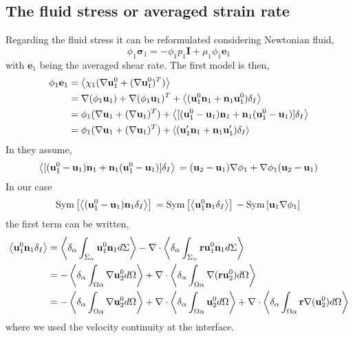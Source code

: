 \subsection{The fluid stress or averaged strain rate}
Regarding the fluid stress it can be reformulated considering Newtonian fluid,
\begin{equation}
    \phi_1 \bm{\sigma}_1 
    = - \phi_1 p_1 \textbf{I}
    + \mu_1 \phi_1 \textbf{e}_1
\end{equation}
with $\textbf{e}_1$ being the averaged shear rate. 
The first model is then, 
\begin{align*}
    \phi_1 \textbf{e}_1
    &= \left<\chi_1 (\nabla \textbf{u}_1^0+(\nabla \textbf{u}_1^0)^T)\right>\\
    &= \nabla (\phi_1\textbf{u}_1)+ \mathbf{\nabla} (\phi_1\textbf{u}_1)^T
    + \left<(\textbf{u}_1^0  \textbf{n}_1 +  \textbf{n}_1\textbf{u}_1^0)\delta_I\right>\\
    &= \phi_1 (\nabla \textbf{u}_1+ (\mathbf{\nabla} \textbf{u}_1)^T)
    + \left<[(\textbf{u}_1^0 - \textbf{u}_1)  \textbf{n}_1 +  \textbf{n}_1(\textbf{u}_1^0 - \textbf{u}_1 )]\delta_I\right>\\
    &= \phi_1 (\nabla \textbf{u}_1+ (\mathbf{\nabla} \textbf{u}_1)^T)
    + \left<(\textbf{u}_1' \textbf{n}_1 +  \textbf{n}_1\textbf{u}_1')\delta_I\right>\\
\end{align*}
In \citet[chap 9]{ishii2010thermo} they assume,
\begin{equation}
    \left<[(\textbf{u}_1^0 - \textbf{u}_1)  \textbf{n}_1 +  \textbf{n}_1(\textbf{u}_1^0 - \textbf{u}_1 )]\delta_I\right>\\
    = 
    (\textbf{u}_2 - \textbf{u}_1)  \mathbf{\nabla} \phi_1 +  \mathbf{\nabla} \phi_1(\textbf{u}_2 - \textbf{u}_1 )\\
\end{equation}
In our case 
\begin{equation}
    \text{Sym}\left[\left<(\textbf{u}_1^0 - \textbf{u}_1)  \textbf{n}_1\delta_I \right> \right]\\
    = 
    \text{Sym}\left[\left<\textbf{u}_1^0  \textbf{n}_1\delta_I  \right> \right]\\
    - \text{Sym}\left[\textbf{u}_1 \mathbf{\nabla} \phi_1 \right]\\
\end{equation}
the first term can be written, 
\begin{align}
    \left<\textbf{u}_1^0  \textbf{n}_1\delta_I  \right>
    &=
    \left<\delta_\alpha \int_{\Sigma_\alpha} \textbf{u}_1^0  \textbf{n}_1 d\Sigma  \right>
    -\mathbf{\nabla} \cdot \left<\delta_\alpha \int_{\Sigma_\alpha} \textbf{r}\textbf{u}_1^0  \textbf{n}_1 d\Sigma  \right>\\
    &=
    - \left<\delta_\alpha \int_{\Omega\alpha} \mathbf{\nabla} \textbf{u}_2^0   d\Omega   \right>
    + \mathbf{\nabla} \cdot \left<\delta_\alpha \int_{\Omega\alpha} \mathbf{\nabla} (\textbf{ru}_2^0 )  d\Omega   \right>\\
    &=
    - \left<\delta_\alpha \int_{\Omega\alpha} \mathbf{\nabla} \textbf{u}_2^0   d\Omega   \right>
    + \mathbf{\nabla} \cdot\left<\delta_\alpha \int_{\Omega\alpha} \textbf{u}_2^0   d\Omega   \right>
    + \mathbf{\nabla} \cdot\left<\delta_\alpha \int_{\Omega\alpha} \textbf{r} \mathbf{\nabla} (\textbf{u}_2^0 )  d\Omega   \right>
\end{align}
where we used the velocity continuity at the interface. 

